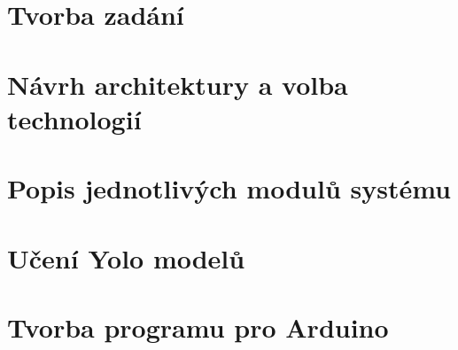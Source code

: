 \newpage
\chapter{Tvorba zadání}\label{ch:tvorba-zadani}
\newcommand{\textcolorname}{black}
\textcolor{\textcolorname}{}

\newpage
\chapter{Návrh architektury a volba technologií}\label{ch:navrh-architektury-a-volba-technologii}
\textcolor{\textcolorname}{}

\newpage
\chapter{Popis jednotlivých modulů systému}\label{ch:popis-jednotlivych-modulu}
\textcolor{\textcolorname}{}
\textcolor{\textcolorname}{}
\textcolor{\textcolorname}{}
\textcolor{\textcolorname}{}
\textcolor{\textcolorname}{}
\textcolor{\textcolorname}{}
\textcolor{\textcolorname}{}
\textcolor{\textcolorname}{}
\textcolor{\textcolorname}{}
\textcolor{\textcolorname}{}
\textcolor{\textcolorname}{}
\textcolor{\textcolorname}{}
\textcolor{\textcolorname}{}

\newpage
\chapter{Učení Yolo modelů}\label{ch:uceni_yolo_modelu}
\textcolor{\textcolorname}{}
\newpage
\textcolor{\textcolorname}{}

\newpage
\chapter{Tvorba programu pro Arduino}\label{ch:tvorba-programu-pro-arduino}
\textcolor{\textcolorname}{}

